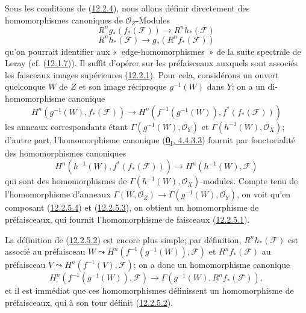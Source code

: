 \begin{env}[12.2.5]
\label{0.12.2.5-fr}
Sous les conditions de (\hyperref[0.12.2.4-fr]{12.2.4}), nous allons définir
directement des homomorphismes canoniques de $\mathcal O_Z$-Modules
\[
\label{0.12.2.5.1-fr}
\tag{12.2.5.1}
R^n g_*(f_*(\mathcal F))\longrightarrow R^n h_*(\mathcal F)
\]
\[
\label{0.12.2.5.2-fr}
\tag{12.2.5.2}
R^n h_*(\mathcal F)\longrightarrow g_*(R^n f_*(\mathcal F))
\]
qu'on pourrait identifier aux «~edge-homomorphismes~» de la suite spectrale
de Leray (cf. (\hyperref[0.12.1.7-fr]{12.1.7})). Il suffit d'opérer sur les
préfaisceaux auxquels sont associés les faisceaux images supérieures
(\hyperref[0.12.2.1-fr]{12.2.1}). Pour cela, considérons un ouvert quelconque
$W$ de $Z$ et son image réciproque $g^{-1}(W)$ dans $Y$; on a un
di-homomorphisme canonique
\[
\label{0.12.2.5.3-fr}
\tag{12.2.5.3}
H^n(g^{-1}(W),f_*(\mathcal F))\longrightarrow
H^n(f^{-1}(g^{-1}(W)),f^*(f_*(\mathcal F)))
\]
les anneaux correspondants étant $\Gamma(g^{-1}(W),\mathcal O_Y)$ et
$\Gamma(h^{-1}(W),\mathcal O_X)$; d'autre part, l'homomorphisme canonique
(\hyperref[0.4.4.3.3-fr]{\textbf{0}\textsubscript{I}, 4.4.3.3}) fournit par
fonctorialité des homomorphismes canoniques
\[
\label{0.12.2.5.4-fr}
\tag{12.2.5.4}
H^n(h^{-1}(W),f^*(f_*(\mathcal F)))\longrightarrow
H^n(h^{-1}(W),\mathcal F)
\]
qui sont des homomorphismes de $\Gamma(h^{-1}(W),\mathcal O_X)$-modules.
Compte tenu de l'homomorphisme d'anneaux
$\Gamma(W,\mathcal O_Z)\to\Gamma(g^{-1}(W),\mathcal O_Y)$, on voit qu'en
composant (\hyperref[0.12.2.5.4-fr]{12.2.5.4}) et
(\hyperref[0.12.2.5.3-fr]{12.2.5.3}), on obtient un homomorphisme de
préfaisceaux, qui fournit l'homomorphisme de faisceaux
(\hyperref[0.12.2.5.1-fr]{12.2.5.1}).

La définition de (\hyperref[0.12.2.5.2-fr]{12.2.5.2}) est encore plus
simple; par définition, $R^n h_*(\mathcal F)$ est associé au préfaisceau
$W\leadsto H^n(f^{-1}(g^{-1}(W)),\mathcal F)$ et $R^n f_*(\mathcal F)$ au
préfaisceau $V\leadsto H^n(f^{-1}(V),\mathcal F)$; on a donc un homomorphisme
canonique
\[
H^n(f^{-1}(g^{-1}(W)),\mathcal F)\longrightarrow
\Gamma(g^{-1}(W),R^n f_*(\mathcal F)),
\]
et il est immédiat que ces homomorphismes définissent un homomorphisme de
préfaisceaux, qui à son tour définit
(\hyperref[0.12.2.5.2-fr]{12.2.5.2}).
\end{env}

